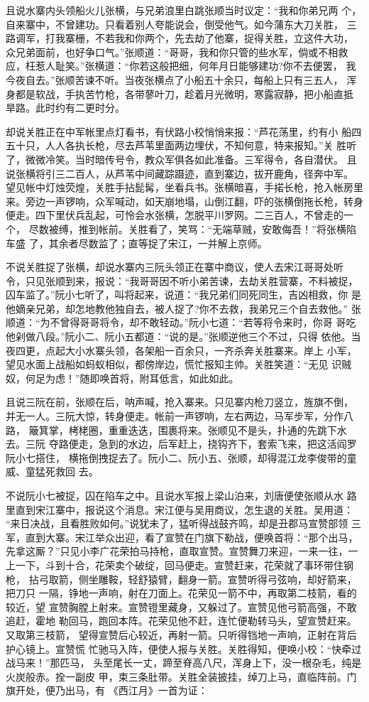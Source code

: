 且说水寨内头领船火儿张横，与兄弟浪里白跳张顺当时议定：“我和你弟兄两
个，自来寨中，不曾建功。只看着别人夸能说会，倒受他气。如今蒲东大刀关胜，
三路调军，打我寨栅，不若我和你两个，先去劫了他寨，捉得关胜，立这件大功，
众兄弟面前，也好争口气。”张顺道：“哥哥，我和你只管的些水军，倘或不相救
应，枉惹人耻笑。”张横道：“你若这般把细，何年月日能够建功?你不去便罢，
我今夜自去。”张顺苦谏不听。当夜张横点了小船五十余只，每船上只有三五人，
浑身都是软战，手执苦竹枪，各带蓼叶刀，趁着月光微明，寒露寂静，把小船直抵
旱路。此时约有二更时分。

却说关胜正在中军帐里点灯看书，有伏路小校悄悄来报：“芦花荡里，约有小
船四五十只，人人各执长枪，尽去芦苇里面两边埋伏，不知何意，特来报知。”关
胜听了，微微冷笑。当时暗传号令，教众军俱各如此准备。三军得令，各自潜伏。
且说张横将引三二百人，从芦苇中间藏踪蹑迹，直到寨边，拔开鹿角，径奔中军。
望见帐中灯烛荧煌，关胜手拈髭髯，坐看兵书。张横暗喜，手掿长枪，抢入帐房里
来。旁边一声锣响，众军喊动，如天崩地塌，山倒江翻，吓的张横倒拖长枪，转身
便走。四下里伏兵乱起，可怜会水张横，怎脱平川罗网。二三百人，不曾走的一个，
尽数被缚，推到帐前。关胜看了，笑骂：“无端草贼，安敢侮吾！”将张横陷车盛
了，其余者尽数监了；直等捉了宋江，一并解上京师。

不说关胜捉了张横，却说水寨内三阮头领正在寨中商议，使人去宋江哥哥处听
令，只见张顺到来，报说：“我哥哥因不听小弟苦谏，去劫关胜营寨，不料被捉，
囚车监了。”阮小七听了，叫将起来，说道：“我兄弟们同死同生，吉凶相救，你
是他嫡亲兄弟，却怎地教他独自去，被人捉了?你不去救，我弟兄三个自去救他。”
张顺道：“为不曾得哥哥将令，却不敢轻动。”阮小七道：“若等将令来时，你哥
哥吃他剁做八段。”阮小二、阮小五都道：“说的是。”张顺逆他三个不过，只得
依他。当夜四更，点起大小水寨头领，各架船一百余只，一齐杀奔关胜寨来。岸上
小军，望见水面上战船如蚂蚁相似，都傍岸边，慌忙报知主帅。关胜笑道：“无见
识贼奴，何足为虑！”随即唤首将，附耳低言，如此如此。

且说三阮在前，张顺在后，呐声喊，抢入寨来。只见寨内枪刀竖立，旌旗不倒，
并无一人。三阮大惊，转身便走。帐前一声锣响，左右两边，马军步军，分作八路，
簸箕掌，栲栳圈，重重迭迭，围裹将来。张顺见不是头，扑通的先跳下水去。三阮
夺路便走，急到的水边，后军赶上，挠钩齐下，套索飞来，把这活阎罗阮小七搭住，
横拖倒拽捉去了。阮小二、阮小五、张顺，却得混江龙李俊带的童威、童猛死救回
去。

不说阮小七被捉，囚在陷车之中。且说水军报上梁山泊来，刘唐便使张顺从水
路里直到宋江寨中，报说这个消息。宋江便与吴用商议，怎生退的关胜。吴用道：
“来日决战，且看胜败如何。”说犹未了，猛听得战鼓齐鸣，却是丑郡马宣赞部领
三军，直到大寨。宋江举众出迎，看了宣赞在门旗下勒战，便唤首将：“那个出马，
先拿这厮？”只见小李广花荣拍马持枪，直取宣赞。宣赞舞刀来迎，一来一往，一
上一下，斗到十合，花荣卖个破绽，回马便走。宣赞赶来，花荣就了事环带住钢枪，
拈弓取箭，侧坐雕鞍，轻舒猿臂，翻身一箭。宣赞听得弓弦响，却好箭来，把刀只
一隔，铮地一声响，射在刀面上。花荣见一箭不中，再取第二枝箭，看的较近，望
宣赞胸膛上射来。宣赞镫里藏身，又躲过了。宣赞见他弓箭高强，不敢追赶，霍地
勒回马，跑回本阵。花荣见他不赶，连忙便勒转马头，望宣赞赶来。又取第三枝箭，
望得宣赞后心较近，再射一箭。只听得铛地一声响，正射在背后护心镜上。宣赞慌
忙驰马入阵，便使人报与关胜。关胜得知，便唤小校：“快牵过战马来！”那匹马，
头至尾长一丈，蹄至脊高八尺，浑身上下，没一根杂毛，纯是火炭般赤。拴一副皮
甲，束三条肚带。关胜全装披挂，绰刀上马，直临阵前。门旗开处，便乃出马，有
《西江月》一首为证：

